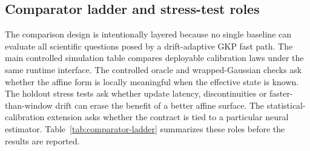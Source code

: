 \documentclass[11pt]{article}
\newcommand{\softwarehil}{controlled simulation}
\begin{document}
\subsection{Comparator ladder and stress-test roles}

The comparison design is intentionally layered because no single baseline can
evaluate all scientific questions posed by a drift-adaptive GKP fast path.  The
main \softwarehil{} table compares deployable calibration laws under the same
runtime interface.  The controlled oracle and wrapped-Gaussian checks ask
whether the affine form is locally meaningful when the effective state is
known.  The holdout stress tests ask whether update latency, discontinuities
or faster-than-window drift can erase the benefit of a better affine surface.
The statistical-calibration extension asks whether the contract is tied to a
particular neural estimator.  Table~\ref{tab:comparator-ladder} summarizes
these roles before the results are reported.
\end{document}
